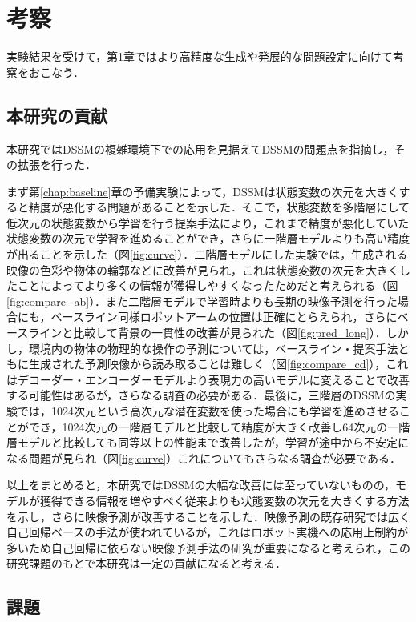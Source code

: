 \chapter{考察}
\label{chap:discussion}

実験結果を受けて，第\ref{chap:discussion}章ではより高精度な生成や発展的な問題設定に向けて考察をおこなう．

\section{本研究の貢献}

本研究ではDSSMの複雑環境下での応用を見据えてDSSMの問題点を指摘し，その拡張を行った．

まず第\ref{chap:baseline}章の予備実験によって，DSSMは状態変数の次元を大きくすると精度が悪化する問題があることを示した．そこで，状態変数を多階層にして低次元の状態変数から学習を行う提案手法により，これまで精度が悪化していた状態変数の次元で学習を進めることができ，さらに一階層モデルよりも高い精度が出ることを示した（図\ref{fig:curve}）．二階層モデルにした実験では，生成される映像の色彩や物体の輪郭などに改善が見られ，これは状態変数の次元を大きくしたことによってより多くの情報が獲得しやすくなったためだと考えられる（図\ref{fig:compare_ab}）．また二階層モデルで学習時よりも長期の映像予測を行った場合にも，ベースライン同様ロボットアームの位置は正確にとらえられ，さらにベースラインと比較して背景の一貫性の改善が見られた（図\ref{fig:pred_long}）．しかし，環境内の物体の物理的な操作の予測については，ベースライン・提案手法ともに生成された予測映像から読み取ることは難しく（図\ref{fig:compare_cd}），これはデコーダー・エンコーダーモデルより表現力の高いモデルに変えることで改善する可能性はあるが，さらなる調査の必要がある．最後に，三階層のDSSMの実験では，1024次元という高次元な潜在変数を使った場合にも学習を進めさせることができ，1024次元の一階層モデルと比較して精度が大きく改善し64次元の一階層モデルと比較しても同等以上の性能まで改善したが，学習が途中から不安定になる問題が見られ（図\ref{fig:curve}）これについてもさらなる調査が必要である．

以上をまとめると，本研究ではDSSMの大幅な改善には至っていないものの，モデルが獲得できる情報を増やすべく従来よりも状態変数の次元を大きくする方法を示し，さらに映像予測が改善することを示した．映像予測の既存研究では広く自己回帰ベースの手法が使われているが，これはロボット実機への応用上制約が多いため自己回帰に依らない映像予測手法の研究が重要になると考えられ，この研究課題のもとで本研究は一定の貢献になると考える．

\section{課題}

